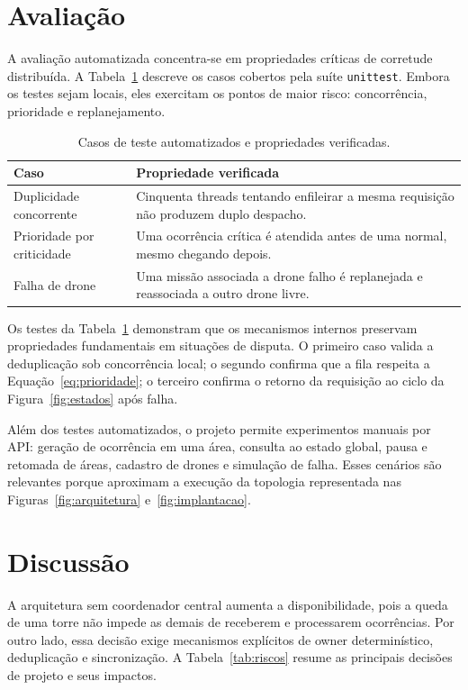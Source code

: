 \documentclass[12pt]{article}
\begin{document}
\section{Avaliação}

A avaliação automatizada concentra-se em propriedades críticas de corretude distribuída. A Tabela~\ref{tab:testes} descreve os casos cobertos pela suíte \texttt{unittest}. Embora os testes sejam locais, eles exercitam os pontos de maior risco: concorrência, prioridade e replanejamento.

\begin{table}[H]
\centering
\caption{Casos de teste automatizados e propriedades verificadas.}
\label{tab:testes}
\begin{tabularx}{\textwidth}{p{4.1cm}X}
\toprule
Caso & Propriedade verificada \\
\midrule
Duplicidade concorrente & Cinquenta threads tentando enfileirar a mesma requisição não produzem duplo despacho. \\
Prioridade por criticidade & Uma ocorrência crítica é atendida antes de uma normal, mesmo chegando depois. \\
Falha de drone & Uma missão associada a drone falho é replanejada e reassociada a outro drone livre. \\
\bottomrule
\end{tabularx}
\end{table}

Os testes da Tabela~\ref{tab:testes} demonstram que os mecanismos internos preservam propriedades fundamentais em situações de disputa. O primeiro caso valida a deduplicação sob concorrência local; o segundo confirma que a fila respeita a Equação~\ref{eq:prioridade}; o terceiro confirma o retorno da requisição ao ciclo da Figura~\ref{fig:estados} após falha.

Além dos testes automatizados, o projeto permite experimentos manuais por API: geração de ocorrência em uma área, consulta ao estado global, pausa e retomada de áreas, cadastro de drones e simulação de falha. Esses cenários são relevantes porque aproximam a execução da topologia representada nas Figuras~\ref{fig:arquitetura} e~\ref{fig:implantacao}.

\section{Discussão}

A arquitetura sem coordenador central aumenta a disponibilidade, pois a queda de uma torre não impede as demais de receberem e processarem ocorrências. Por outro lado, essa decisão exige mecanismos explícitos de owner determinístico, deduplicação e sincronização. A Tabela~\ref{tab:riscos} resume as principais decisões de projeto e seus impactos.
\end{document}

